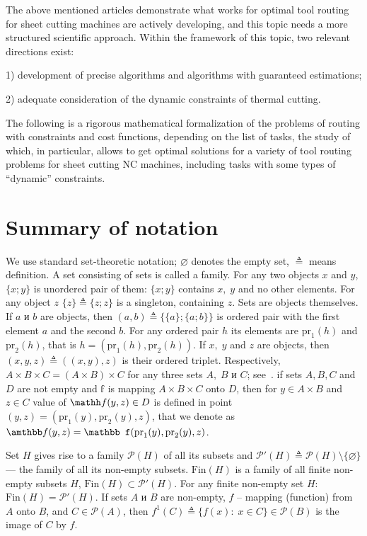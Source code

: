 \documentclass[10pt]{article}
\begin{document}
The above mentioned articles demonstrate
what works for optimal tool routing for
sheet cutting machines are actively developing,
and this topic needs a more structured scientific approach.
Within the framework of this topic, two relevant
directions exist:

1) development of precise algorithms and algorithms with
guaranteed estimations;

2) adequate consideration of the dynamic constraints of thermal cutting.

The following is a rigorous mathematical formalization
of the
problems of routing
with constraints and cost functions,
depending on the list of tasks,
the study of which, in particular,
allows to get optimal solutions for a variety of
tool routing problems
for sheet cutting NC machines,
including tasks with some types of
``dynamic'' constraints.

\section{Summary of notation}
\label{sec:1}

We use standard set-theoretic notation;
$\varnothing$ denotes the empty set,
${\triangleq}$ means definition.
A set consisting of sets
is called a family.
For any two objects $x$
and $y$,
$\{x;y\}$
is unordered pair of them:
$\{x;y\}$ contains $x,\;y$
and no other elements.
For any object $z$
$\{z\} {\triangleq} \{z;z\}$
is a singleton, containing
$z$.
Sets are objects themselves.
If $a$ и $b$ are objects, then
\cite[~67]{15}
$(a,b) {\triangleq} \{\{a\};\{a;b\}\}$
is ordered pair with
the first element $a$
and the second $b$.
For any ordered pair $h$
its elements are
$\mathrm{pr}_1(h)$
and
$\mathrm{pr}_2(h)$,
that is
$h = (\mathrm{pr} _1(h),\mathrm{pr} _2(h))$.
If $x,\;y$ and $z$ are objects,
then
$(x,y,z) {\triangleq} ((x,y),z)$
is their ordered triplet.
Respectively,
$A \times B \times C = (A \times B) \times C$
for any three sets
$A,\;B$ и $C$;
see~\cite[17]{16}.
if sets
$A, B, C$
and
$D$
are not empty and
$\mathbb{f}$
is mapping
$A\times B\times C$ onto $D$,
then for
$y \in A\times B$
and
$z \in C$
value of
$\mathh f(y,z)\in D$
is defined in point
$(y,z) = (\mathrm{pr}_1(y), \mathrm{pr}_2(y), z)$,
that we denote as
$\amthbb f(y,z) = \mathbb f(\mathrm{pr}_1(y), \mathrm{pr}_2(y), z)$.

Set $H$
gives rise to a family $\mathcal{P}(H)$
of all its subsets
and $\mathcal{P}'(H) {\triangleq}
\mathcal{P}(H) \setminus \{\varnothing\}$
--- the family of all its non-empty subsets.
$\mathrm{Fin}(H)$
is a family of all finite
non-empty subsets
$H$,
$\mathrm{Fin}(H) \subset \mathcal{P}'(H)$.
For any finite non-empty set
$H$:
$\mathrm{Fin}(H) = \mathcal{P}'(H)$.
If sets $A$ и $B$ are non-empty,
$f$ -- mapping (function) from $A$ onto $B$,
and $C \in \mathcal{P}(A)$,
then
$f^1(C) {\triangleq} \{f(x):\;x \in C\} \in \mathcal{P}(B)$
is the image of $C$ by $f$.
\end{document}
